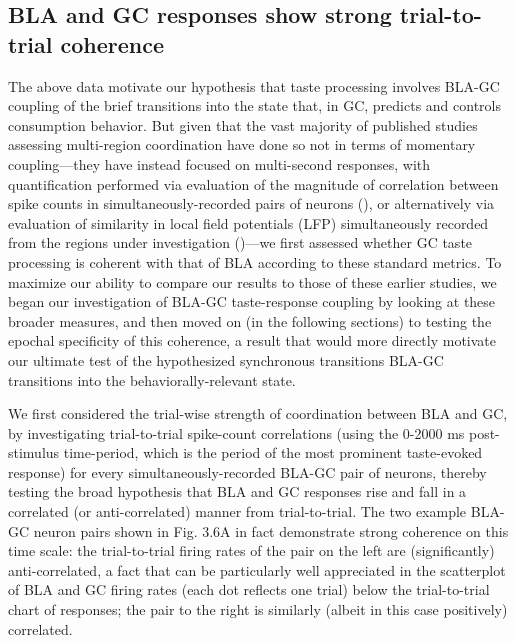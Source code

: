 \begin{refsection}
\subsection{BLA and GC responses show strong trial-to-trial coherence}
The above data motivate our hypothesis that taste processing involves BLA-GC coupling of the brief transitions into the state that, in GC, predicts and controls consumption behavior. But given that the vast majority of published studies assessing multi-region coordination have done so not in terms of momentary coupling—they have instead focused on multi-second responses, with quantification performed via evaluation of the magnitude of correlation between spike counts in simultaneously-recorded pairs of neurons (\cite{averbeck2006a,averbeck2006b}), or alternatively via evaluation of similarity in local field potentials (LFP) simultaneously recorded from the regions under investigation (\cite{place2016a})—we first assessed whether GC taste processing is coherent with that of BLA according to these standard metrics. To maximize our ability to compare our results to those of these earlier studies, we began our investigation of BLA-GC taste-response coupling by looking at these broader measures, and then moved on (in the following sections) to testing the epochal specificity of this coherence, a result that would more directly motivate our ultimate test of the hypothesized synchronous transitions BLA-GC transitions into the behaviorally-relevant state.

We first considered the trial-wise strength of coordination between BLA and GC, by investigating trial-to-trial spike-count correlations (using the 0-2000 ms post-stimulus time-period, which is the period of the most prominent taste-evoked response) for every simultaneously-recorded BLA-GC pair of neurons, thereby testing the broad hypothesis that BLA and GC responses rise and fall in a correlated (or anti-correlated) manner from trial-to-trial. The two example BLA-GC neuron pairs shown in Fig. 3.6A in fact demonstrate strong coherence on this time scale: the trial-to-trial firing rates of the pair on the left are (significantly) anti-correlated, a fact that can be particularly well appreciated in the scatterplot of BLA and GC firing rates (each dot reflects one trial) below the trial-to-trial chart of responses; the pair to the right is similarly (albeit in this case positively) correlated. 


\end{refsection}
